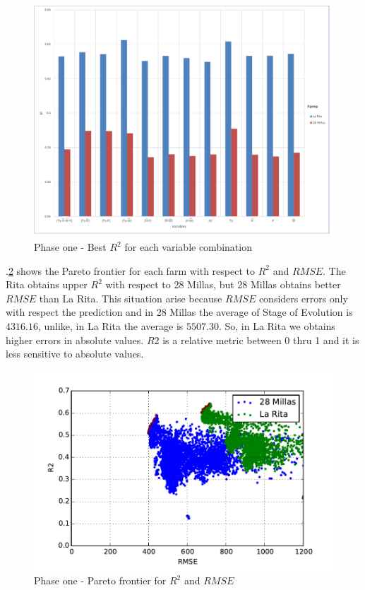 \documentclass[review,authoryear,english]{elsarticle}
\begin{document}
\begin{figure}[H] 
 \centering
 \includegraphics[scale=.5]{Phase_one_Best_R2_for_variables}
 \caption{Phase one - Best $R^2$ for each variable combination} 
 \label{figura6} 
\end{figure}

\figurename $.$\ref{figura7} shows the Pareto frontier for each farm with respect to $R^2$ and $RMSE$. The Rita obtains upper $R^2$ with respect to 28 Millas, but 28 Millas obtains better $RMSE$ than La Rita. This situation arise because $RMSE$ considers errors only with respect the prediction and in 28 Millas the average of Stage of Evolution is $4316.16$, unlike, in La Rita the average is $5507.30$. So, in La Rita we obtains higher errors in absolute values. $R2$ is a relative metric between 0 thru 1 and it is less sensitive to absolute values.

\begin{figure}[H] 
 \centering
 \includegraphics[scale=.8]{Phase_one_R2_RMSE}
 \caption{Phase one - Pareto frontier for $R^2$ and $RMSE$} 
 \label{figura7} 
\end{figure}
\end{document}
